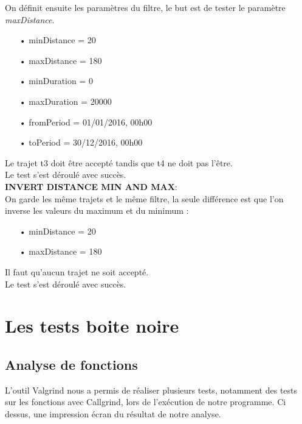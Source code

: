 \documentclass[12pt]{article}
\begin{document}
	On définit ensuite les paramètres du filtre, le but est de tester le paramètre \textit{maxDistance}.
	\begin{itemize}
	\item[•] minDistance = 20
	\item[•] maxDistance = 180
	\item[•] minDuration = 0
	\item[•] maxDuration = 20000
	\item[•] fromPeriod = 01/01/2016, 00h00
	\item[•] toPeriod = 30/12/2016, 00h00
	\end{itemize}

	Le trajet t3 doit être accepté tandis que t4 ne doit pas l’être.\\

	Le test s’est déroulé avec succès.\\


	\textbf{INVERT DISTANCE MIN AND MAX}:\\
	On garde les même trajets et le même filtre, la seule différence est que l’on inverse les valeurs du maximum et du minimum :\\
	\begin{itemize}
	\item[•] minDistance = 20	
	\item[•] maxDistance = 180
	\end{itemize}

	Il faut qu’aucun trajet ne soit accepté. \\

	Le test s’est déroulé avec succès. \\
	

	\section{Les tests boite noire}	
		\subsection{Analyse de fonctions}
		L’outil Valgrind nous a permis de réaliser plusieurs tests, notamment des tests sur les
		fonctions avec Callgrind, lors de l'exécution de notre programme. Ci dessus, une
		impression écran du résultat de notre analyse.\\
	
\end{document}
